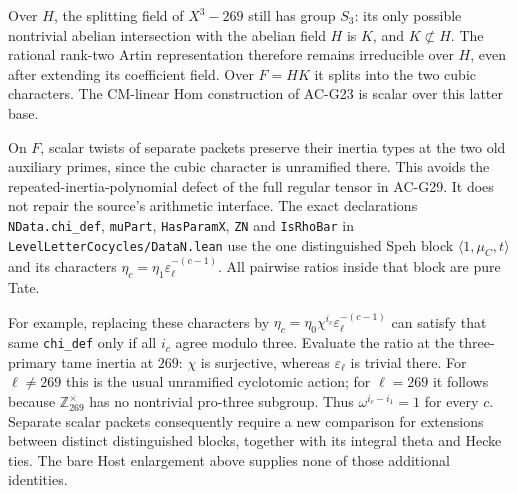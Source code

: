 \begin{remark}
Over $H$, the splitting field of $X^3-269$ still has group
$S_3$: its only possible nontrivial abelian intersection
with the abelian field $H$ is $K$, and $K\not\subset H$.
The rational rank-two Artin representation therefore remains
irreducible over $H$, even after extending its coefficient
field.  Over $F=HK$ it splits into the two cubic characters.
The CM-linear Hom construction of AC-G23 is scalar over
this latter base.

On $F$, scalar twists of separate packets preserve their
inertia types at the two old auxiliary primes, since the
cubic character is unramified there.  This avoids the
repeated-inertia-polynomial defect of the full regular
tensor in AC-G29.  It does not repair the source's
arithmetic interface.  The exact declarations
\texttt{NData.chi\_def}, \texttt{muPart},
\texttt{HasParamX}, \texttt{ZN} and \texttt{IsRhoBar}
in \texttt{LevelLetterCocycles/DataN.lean} use the one
distinguished Speh block
$\langle1,\mu_C,t\rangle$ and its characters
$\eta_c=\eta_1\varepsilon_\ell^{-(c-1)}$.
All pairwise ratios inside that block are pure Tate.

For example, replacing these characters by
$\eta_c=\eta_0\chi^{i_c}\varepsilon_\ell^{-(c-1)}$
can satisfy that same \texttt{chi\_def} only if all
$i_c$ agree modulo three.  Evaluate the ratio at the
three-primary tame inertia at $269$: $\chi$ is surjective,
whereas $\varepsilon_\ell$ is trivial there.  For
$\ell\ne269$ this is the usual unramified cyclotomic
action; for $\ell=269$ it follows because
$\mathbb Z_{269}^\times$ has no nontrivial pro-three
subgroup.  Thus $\omega^{i_c-i_1}=1$ for every $c$.
Separate scalar packets consequently require a new
comparison for extensions between distinct distinguished
blocks, together with its integral theta and Hecke ties.
The bare Host enlargement above supplies none of those
additional identities.
\end{remark}

